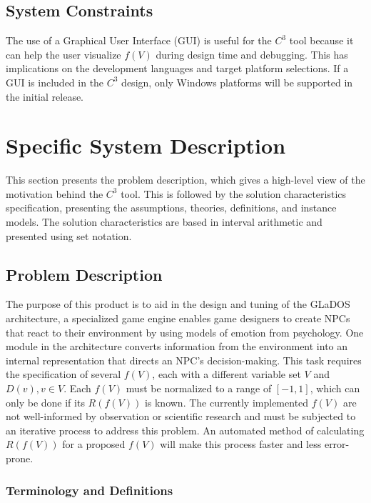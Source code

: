 \documentclass[12pt]{article}
\newcommand{\prognameAbbrv}{$C^{3}$}
\begin{document}
\subsection{System Constraints}
\label{sec_sysconstraints}
The use of a Graphical User Interface (GUI) is useful for the \prognameAbbrv{} 
tool because it can help the user visualize $f(V)$ during design time and 
debugging. This has implications on the development languages and target 
platform selections. If a GUI is included in the \prognameAbbrv{} design, only 
Windows platforms will be supported in the initial release.

\section{Specific System Description}
\label{specific}
This section presents the problem description, which gives a high-level
view of the motivation behind the \prognameAbbrv{} tool. This is followed by 
the solution characteristics specification, presenting the assumptions, 
theories, definitions, and instance models. The solution characteristics are 
based in interval arithmetic and presented using set notation. 

\subsection{Problem Description} 
\label{Sec_pd}
The purpose of this product is to aid in the design and tuning of the GLaDOS 
architecture, a specialized game engine enables game designers to create NPCs 
that react to their environment by using models of emotion from psychology. One 
module in the architecture converts information from the environment into an 
internal representation that directs an NPC's decision-making. This task 
requires the specification of several $f(V)$, each with a different variable 
set $V$ and $D(v), v \in V$. Each $f(V)$ must be normalized to a range of 
$[-1,1]$, which can only be done if its $R(f(V))$ is known. The currently 
implemented $f(V)$ are not well-informed by observation or scientific research 
and must be subjected to an iterative process to address this problem. An 
automated method of calculating $R(f(V))$ for a proposed $f(V)$ will make this 
process faster and less error-prone.

\subsubsection{Terminology and  Definitions}
\end{document}
